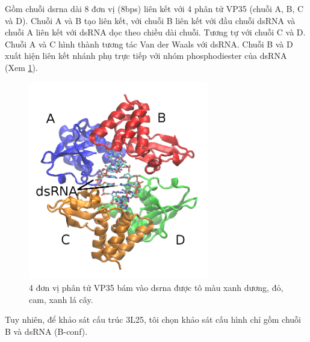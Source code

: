 \documentclass[12pt,a4paper,reqno, oneside]{book}
\begin{document}
		Gồm chuỗi \gls{dsrna} dài 8 đơn vị (8bps) liên kết với 4 phân tử VP35 (chuỗi A, B, C và D). Chuỗi A và B tạo liên kết, với chuỗi B liên kết với đầu chuỗi dsRNA và chuỗi A liên kết với dsRNA dọc theo chiều dài chuỗi. Tương tự với chuỗi C và D. Chuỗi A và C hình thành tương tác Van der Waals với dsRNA. Chuỗi B và D xuất hiện liên kết nhánh phụ trực tiếp với nhóm phosphodiester của dsRNA\cite{Leung2010} (Xem \ref{fig:vp35}).
		\clearpage
		\begin{figure}[t!]
		\centering
		\includegraphics[width=0.7\textwidth,natwidth=610,natheight=642]{VP35.png}
		\caption{4 đơn vị phân tử VP35 bám vào \gls{dsrna} được tô màu xanh dương, đỏ, cam, xanh lá cây.}
		\label{fig:vp35}
		\end{figure}
		Tuy nhiên, để khảo sát cấu trúc 3L25, tôi chọn khảo sát cấu hình chỉ gồm chuỗi B và dsRNA (B-conf).
%	
\end{document}
